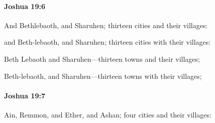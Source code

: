 		\paragraph{Joshua 19:6} %
			\label{JOSHUA-19-6}

			And Bethlebaoth, and Sharuhen; thirteen cities and their villages:

			\begin{versebox}
					\item[BHS] 
					\item[ASV] and Beth-lebaoth, and Sharuhen; thirteen cities with their villages:
					\item[NIV] Beth Lebaoth and Sharuhen—thirteen towns and their villages;
					\item[NRSV] Beth-lebaoth, and Sharuhen—thirteen towns with their villages;
			\end{versebox}

		\paragraph{Joshua 19:7} %
			\label{JOSHUA-19-7}

			Ain, Remmon, and Ether, and Ashan; four cities and their villages:

